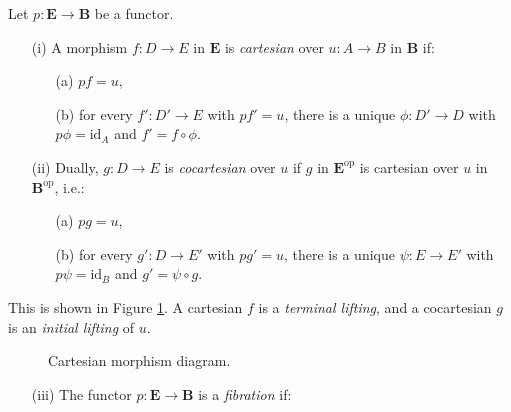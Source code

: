 \documentclass{article}
\begin{document}
\begin{definition}
\label{def:2.1}
Let $p : \mathbf{E} \to \mathbf{B}$ be a functor.
\begin{enumerate}
    \item[(i)] A morphism $f : D \to E$ in $\mathbf{E}$ is \emph{cartesian} over $u : A \to B$ in $\mathbf{B}$ if:
        \begin{itemize}
            \item[(a)] $p f = u$,
            \item[(b)] for every $f' : D' \to E$ with $p f' = u$, there is a unique $\phi : D' \to D$ with $p \phi = \text{id}_A$ and $f' = f \circ \phi$.
        \end{itemize}
    \item[(ii)] Dually, $g : D \to E$ is \emph{cocartesian} over $u$ if $g$ in $\mathbf{E}^{\text{op}}$ is cartesian over $u$ in $\mathbf{B}^{\text{op}}$, i.e.:
        \begin{itemize}
            \item[(a)] $p g = u$,
            \item[(b)] for every $g' : D \to E'$ with $p g' = u$, there is a unique $\psi : E \to E'$ with $p \psi = \text{id}_B$ and $g' = \psi \circ g$.
        \end{itemize}
\end{enumerate}
This is shown in Figure \ref{fig:cartesian-cocartesian}. A cartesian $f$ is a \emph{terminal lifting}, and a cocartesian $g$ is an \emph{initial lifting} of $u$.
\begin{figure}[h]
    \centering
    \caption{Cartesian morphism diagram.}
    \label{fig:cartesian-cocartesian}
\end{figure}
\begin{enumerate}
    \item[(iii)] The functor $p : \mathbf{E} \to \mathbf{B}$ is a \emph{fibration} if:
        \begin{itemize}

\end{itemize}
\end{enumerate}
\end{definition}
\end{document}
